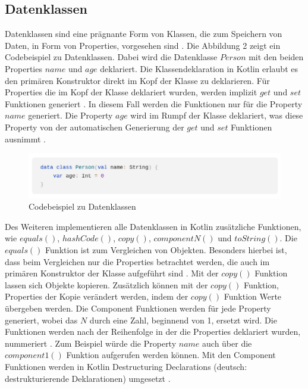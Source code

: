 \documentclass{article}
\begin{document}
\subsection{Datenklassen}
Datenklassen sind eine prägnante Form von Klassen, die zum Speichern von Daten, in Form von Properties, vorgesehen sind \cite{KotlinLangDoc}. Die Abbildung 2 zeigt ein Codebeispiel zu Datenklassen. Dabei wird die Datenklasse $Person$ mit den beiden Properties $name$ und $age$ deklariert. Die Klassendeklaration in Kotlin erlaubt es den primären Konstruktor direkt im Kopf der Klasse zu deklarieren. Für Properties die im Kopf der Klasse deklariert wurden, werden implizit $get$ und $set$ Funktionen generiert \cite{KotlinLangDoc}. In diesem Fall werden die Funktionen nur für die Property $name$ generiert. Die Property $age$ wird im Rumpf der Klasse deklariert, was diese Property von der automatischen Generierung der $get$ und $set$ Funktionen ausnimmt \cite{KotlinLangDoc}.
\begin{figure}[!htb]
    \centering
    \includegraphics[width=\linewidth]{img/Dataclass.png}
    \caption{Codebeispiel zu Datenklassen\footnotemark}
\end{figure}
\newline
Des Weiteren implementieren alle Datenklassen in Kotlin zusätzliche Funktionen, wie $equals()$, $hashCode()$, $copy()$, $componentN()$ und $toString()$. Die $equals()$ Funktion ist zum Vergleichen von Objekten. Besonders hierbei ist, dass beim Vergleichen nur die Properties betrachtet werden, die auch im primären Konstruktor der Klasse aufgeführt sind \cite{KotlinLangDoc}. Mit der $copy()$ Funktion lassen sich Objekte kopieren. Zusätzlich können mit der $copy()$ Funktion, Properties der Kopie verändert werden, indem der $copy()$ Funktion Werte übergeben werden. Die Component Funktionen werden für jede Property generiert, wobei das $N$ durch eine Zahl, beginnend von 1, ersetzt wird. Die Funktionen werden nach der Reihenfolge in der die Properties deklariert wurden, nummeriert \cite{KotlinLangDoc}. Zum Beispiel würde die Property $name$ auch über die $component1()$ Funktion aufgerufen werden können. Mit den Component Funktionen werden in Kotlin Destructuring Declarations (deutsch: destrukturierende Deklarationen) umgesetzt \cite{KotlinLangDoc}.
\end{document}
